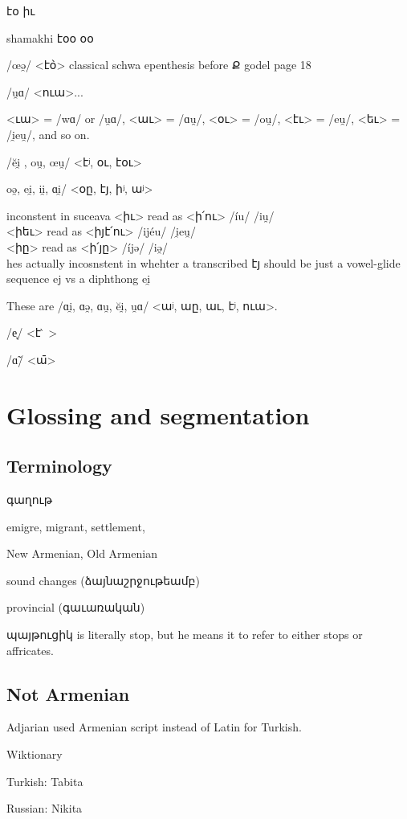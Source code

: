 էօ իւ

shamakhi
էօօ
օօ

/œə̯/ <է\`օ>
classical schwa epenthesis before Ք godel page 18

/u̯ɑ/ <ուա>... 

<ւա> = /wɑ/ or /u̯ɑ/, <աւ> = /ɑu̯/, <օւ> = /ou̯/, <էւ> = /eu̯/, <եւ> = /i̯eu̯/, and so on. 

 /ĕi̯     ,  ou̯, œu̯/  <էʲ,  օւ, էօւ>

 oə̯, ei̯, ii̯, ɑi̯/ <օը, էյ, իʲ, աʲ>

inconstent in suceava         <իւ>   read as <ի՛ու> /\'iu/   /iu̯/ \\ 
        <իեւ>   read as <իյէ՛ու> /ij\'eu/  /i̯eu̯/ \\
        <իը>   read as  <ի՛յը> /\'ijə/  /iə̯/ \\ 
        

 hes actually incosnstent in whehter a transcribed էյ should be just a vowel-glide sequence ej vs a diphthong ei̯ 


These are /ɑi̯,  ɑə̯, ɑu̯,  ĕi̯, u̯ɑ/  <աʲ,   աը, աւ, էʲ,  ուա>.


/e̞/ <է ̀ >

/ɑ̃/ <ա̄>
\section{Glossing and segmentation}
\subsection{Terminology}

գաղութ

emigre, migrant, settlement, 


New Armenian, Old Armenian


sound changes (ձայնաշրջութեամբ) 

provincial (գաւառական)


պայթուցիկ is literally stop, but he means it to refer to either stops or affricates. 





\subsection{Not Armenian}
Adjarian used Armenian script instead of Latin for Turkish. 


Wiktionary

Turkish: Tabita

Russian: Nikita

